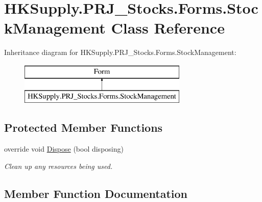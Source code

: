 \hypertarget{class_h_k_supply_1_1_p_r_j___stocks_1_1_forms_1_1_stock_management}{}\section{H\+K\+Supply.\+P\+R\+J\+\_\+\+Stocks.\+Forms.\+Stock\+Management Class Reference}
\label{class_h_k_supply_1_1_p_r_j___stocks_1_1_forms_1_1_stock_management}
Inheritance diagram for H\+K\+Supply.\+P\+R\+J\+\_\+\+Stocks.\+Forms.\+Stock\+Management\+:\begin{figure}[H]
\begin{center}
\leavevmode
\includegraphics[height=2.000000cm]{class_h_k_supply_1_1_p_r_j___stocks_1_1_forms_1_1_stock_management}
\end{center}
\end{figure}
\subsection*{Protected Member Functions}
\begin{DoxyCompactItemize}
\item 
override void \mbox{\hyperlink{class_h_k_supply_1_1_p_r_j___stocks_1_1_forms_1_1_stock_management_a1932bec07ffecc0d95fa8ef402b66166}{Dispose}} (bool disposing)
\begin{DoxyCompactList}\small\item\em Clean up any resources being used. \end{DoxyCompactList}\end{DoxyCompactItemize}


\subsection{Member Function Documentation}
\mbox{\label{class_h_k_supply_1_1_p_r_j___stocks_1_1_forms_1_1_stock_management_a1932bec07ffecc0d95fa8ef402b66166}} 
